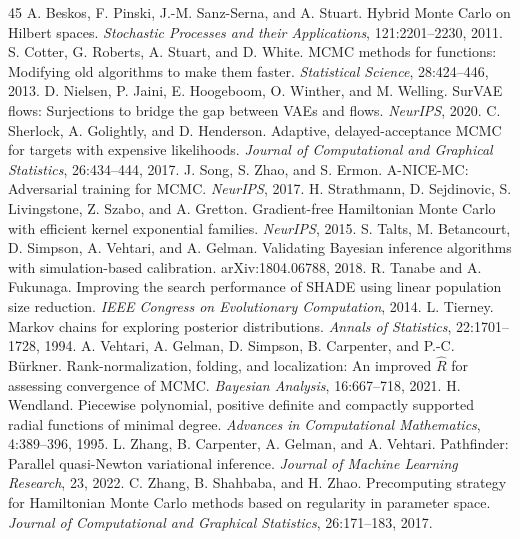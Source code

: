 \documentclass[11pt]{article}
\theoremstyle{remark}
\begin{document}
\begin{thebibliography}{45}
 A. Beskos, F. Pinski,
J.-M. Sanz-Serna, and A. Stuart. Hybrid Monte Carlo on Hilbert spaces.
\emph{Stochastic Processes and their Applications}, 121:2201--2230,
2011.
 S. Cotter, G. Roberts,
A. Stuart, and D. White. MCMC methods for functions: Modifying old
algorithms to make them faster. \emph{Statistical Science},
28:424--446, 2013.
 D. Nielsen, P. Jaini,
E. Hoogeboom, O. Winther, and M. Welling. SurVAE flows: Surjections to
bridge the gap between VAEs and flows. \emph{NeurIPS}, 2020.
 C. Sherlock,
A. Golightly, and D. Henderson. Adaptive, delayed-acceptance MCMC for
targets with expensive likelihoods. \emph{Journal of Computational and
Graphical Statistics}, 26:434--444, 2017.
 J. Song, S. Zhao, and S. Ermon.
A-NICE-MC: Adversarial training for MCMC. \emph{NeurIPS}, 2017.
 H. Strathmann,
D. Sejdinovic, S. Livingstone, Z. Szabo, and A. Gretton. Gradient-free
Hamiltonian Monte Carlo with efficient kernel exponential families.
\emph{NeurIPS}, 2015.
 S. Talts, M. Betancourt,
D. Simpson, A. Vehtari, and A. Gelman. Validating Bayesian inference
algorithms with simulation-based calibration. arXiv:1804.06788, 2018.
 R. Tanabe and
A. Fukunaga. Improving the search performance of SHADE using linear
population size reduction. \emph{IEEE Congress on Evolutionary
Computation}, 2014.
 L. Tierney. Markov chains for
exploring posterior distributions. \emph{Annals of Statistics},
22:1701--1728, 1994.
 A. Vehtari, A. Gelman,
D. Simpson, B. Carpenter, and P.-C. B\"urkner. Rank-normalization,
folding, and localization: An improved $\widehat R$ for assessing
convergence of MCMC. \emph{Bayesian Analysis}, 16:667--718, 2021.
 H. Wendland. Piecewise
polynomial, positive definite and compactly supported radial functions
of minimal degree. \emph{Advances in Computational Mathematics},
4:389--396, 1995.
 L. Zhang, B. Carpenter,
A. Gelman, and A. Vehtari. Pathfinder: Parallel quasi-Newton variational
inference. \emph{Journal of Machine Learning Research}, 23, 2022.
 C. Zhang, B. Shahbaba, and
H. Zhao. Precomputing strategy for Hamiltonian Monte Carlo methods
based on regularity in parameter space. \emph{Journal of Computational
and Graphical Statistics}, 26:171--183, 2017.
\end{thebibliography}
\end{document}
